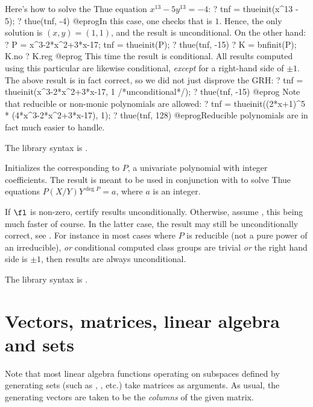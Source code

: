 Here's how to solve the Thue equation $x^{13} - 5y^{13} = - 4$:
\bprog
? tnf = thueinit(x^13 - 5);
? thue(tnf, -4)
@eprog\noindent In this case, one checks that 
is $1$. Hence, the only solution is $(x,y) = (1,1)$, and the result is
unconditional. On the other hand:
\bprog
? P = x^3-2*x^2+3*x-17; tnf = thueinit(P);
? thue(tnf, -15)
? K = bnfinit(P); K.no
? K.reg
@eprog
This time the result is conditional. All results computed using this
particular  are likewise conditional, \emph{except} for a right-hand
side of $\pm 1$.
The above result is in fact correct, so we did not just disprove the GRH:
\bprog
? tnf = thueinit(x^3-2*x^2+3*x-17, 1 /*unconditional*/);
? thue(tnf, -15)
@eprog
Note that reducible or non-monic polynomials are allowed:
\bprog
? tnf = thueinit((2*x+1)^5 * (4*x^3-2*x^2+3*x-17), 1);
? thue(tnf, 128)
@eprog\noindent Reducible polynomials are in fact much easier to handle.

The library syntax is .

\label{se:thueinit}
Initializes the  corresponding to $P$, a univariate polynomial
with integer coefficients. The result is meant to be used in conjunction with
 to solve Thue equations $P(X / Y)Y^{\deg P} = a$, where $a$ is an
integer.

If $\fl$ is non-zero, certify results unconditionally. Otherwise, assume
, this being much faster of course. In the latter case, the result
may still be unconditionally correct, see . For instance in most
cases where $P$ is reducible (not a pure power of an irreducible), \emph{or}
conditional computed class groups are trivial \emph{or} the right hand side
is $\pm1$, then results are always unconditional.

The library syntax is .

\section{Vectors, matrices, linear algebra and sets}
\label{se:linear_algebra}

Note that most linear algebra functions operating on subspaces defined by
generating sets (such as , , etc.) take matrices as
arguments. As usual, the generating vectors are taken to be the
\emph{columns} of the given matrix.


